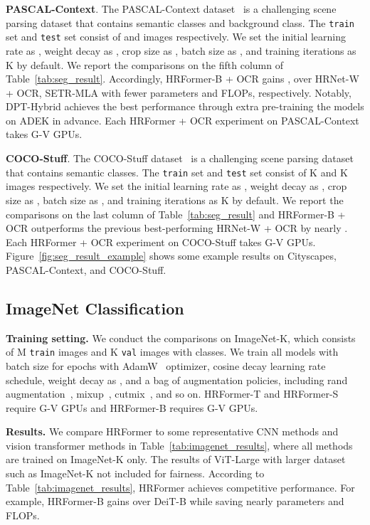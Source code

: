 \documentclass{article}
\begin{document}
\vspace{1mm}
\noindent\textbf{PASCAL-Context}.
The PASCAL-Context dataset~\cite{mottaghi2014role} is a challenging
scene parsing dataset that contains  semantic
classes and  background class.
The \texttt{train} set and \texttt{test} set consist of
 and  images respectively.
We set the initial learning rate as , weight decay as , crop size as , batch size as , and training iterations as K by default.
We report the comparisons on
the fifth column of Table~\ref{tab:seg_result}.
Accordingly,
HRFormer-B + OCR gains ,  over HRNet-W + OCR, SETR-MLA with fewer parameters
and FLOPs, respectively.
Notably, DPT-Hybrid achieves the best performance through extra pre-training the models
on ADEK in advance.
Each HRFormer + OCR experiment on PASCAL-Context takes  G-V GPUs.


\vspace{1mm}
\noindent\textbf{COCO-Stuff}.
The COCO-Stuff dataset~\cite{caesar2018coco} is a challenging
scene parsing dataset that contains  semantic
classes.
The \texttt{train} set and \texttt{test} set consist of
K and K images respectively.
We set the initial learning rate as , weight decay as , crop size as , batch size as , and training iterations as K by default.
We report the comparisons on the last column of Table~\ref{tab:seg_result}
and HRFormer-B + OCR outperforms the previous best-performing HRNet-W + OCR by nearly .
Each HRFormer + OCR experiment on COCO-Stuff takes  G-V GPUs.
Figure~\ref{fig:seg_result_example} shows some example results on Cityscapes,
PASCAL-Context, and COCO-Stuff.



\subsection{ImageNet Classification}
\noindent\textbf{Training setting.}
We conduct the comparisons on ImageNet-K,
which consists of M \texttt{train} images and K \texttt{val} images
with  classes.
We train all models with batch size  for  epochs with AdamW~\cite{loshchilov2017decoupled} optimizer,
cosine decay learning rate schedule, weight decay as ,
and a bag of augmentation policies, including rand augmentation~\cite{cubuk2019randaugment},
mixup~\cite{zhang2017mixup}, cutmix~\cite{yun2019cutmix}, and so on.
HRFormer-T and HRFormer-S require G-V GPUs and HRFormer-B requires G-V GPUs.

\noindent\textbf{Results.}
We compare HRFormer to some representative CNN methods and vision transformer methods in Table~\ref{tab:imagenet_results}, where all methods are trained on ImageNet-K only.
The results of ViT-Large with larger dataset such as ImageNet-K not included for fairness.
According to Table~\ref{tab:imagenet_results}, HRFormer achieves competitive performance.
For example, HRFormer-B gains  over DeiT-B
while saving nearly  parameters and  FLOPs.
\end{document}
